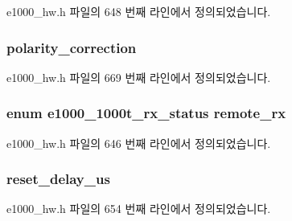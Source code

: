 e1000\+\_\+hw.\+h 파일의 648 번째 라인에서 정의되었습니다.

\subsubsection[{\texorpdfstring{polarity\+\_\+correction}{polarity_correction}}]{ polarity\+\_\+correction}\hypertarget{structe1000__phy__info_ac84e408da2be489fc2710ee5d83e0c89}{}\label{structe1000__phy__info_ac84e408da2be489fc2710ee5d83e0c89}


e1000\+\_\+hw.\+h 파일의 669 번째 라인에서 정의되었습니다.

\subsubsection[{\texorpdfstring{remote\+\_\+rx}{remote_rx}}]{\setlength{\rightskip}{0pt plus 5cm}enum {\bf e1000\+\_\+1000t\+\_\+rx\+\_\+status} remote\+\_\+rx}\hypertarget{structe1000__phy__info_a55d14440fe8866da55bdfd5af6392813}{}\label{structe1000__phy__info_a55d14440fe8866da55bdfd5af6392813}


e1000\+\_\+hw.\+h 파일의 646 번째 라인에서 정의되었습니다.

\subsubsection[{\texorpdfstring{reset\+\_\+delay\+\_\+us}{reset_delay_us}}]{ reset\+\_\+delay\+\_\+us}\hypertarget{structe1000__phy__info_a4f6536113c0430432056bb36bd390e12}{}\label{structe1000__phy__info_a4f6536113c0430432056bb36bd390e12}


e1000\+\_\+hw.\+h 파일의 654 번째 라인에서 정의되었습니다.

